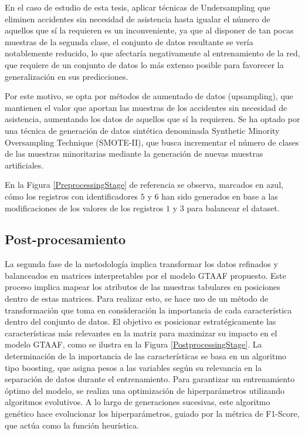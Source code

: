 \documentclass{uathesis-es}
\begin{document}
En el caso de estudio de esta tesis, aplicar técnicas de Undersampling que eliminen accidentes sin necesidad de asistencia hasta igualar el número de aquellos que sí la requieren es un inconveniente, ya que al disponer de tan pocas muestras de la segunda clase, el conjunto de datos resultante se vería notablemente reducido, lo que afectaría negativamente al entrenamiento de la red, que requiere de un conjunto de datos lo más extenso posible para favorecer la generalización en sus predicciones.

Por este motivo, se opta por métodos de aumentado de datos (upsampling), que mantienen el valor que aportan las muestras de los accidentes sin necesidad de asistencia, aumentando los datos de aquellos que sí la requieren. Se ha optado por una técnica de generación de datos sintética denominada Synthetic Minority Oversampling Technique (SMOTE-II), que busca incrementar el número de clases de las muestras minoritarias mediante la generación de nuevas muestras artificiales.

En la Figura \ref{PreprocessingStage} de referencia se observa, marcados en azul, cómo los registros con identificadores $5$ y $6$ han sido generados en base a las modificaciones de los valores de los registros $1$ y $3$ para balancear el dataset.



\subsection{Post-procesamiento}

La segunda fase de la metodología implica transformar los datos refinados y balanceados en matrices interpretables por el modelo GTAAF propuesto. Este proceso implica mapear los atributos de las muestras tabulares en posiciones dentro de estas matrices. Para realizar esto, se hace uso de un método de transformación que toma en consideración la importancia de cada característica dentro del conjunto de datos. El objetivo es posicionar estratégicamente las características más relevantes en la matriz para maximizar su impacto en el modelo GTAAF, como se ilustra en la Figura \ref{PostprocessingStage}. La determinación de la importancia de las características se basa en un algoritmo tipo boosting, que asigna pesos a las variables según su relevancia en la separación de datos durante el entrenamiento. Para garantizar un entrenamiento óptimo del modelo, se realiza una optimización de hiperparámetros utilizando algoritmos evolutivos. A lo largo de generaciones sucesivas, este algoritmo genético hace evolucionar los hiperparámetros, guiado por la métrica de F1-Score, que actúa como la función heurística.
\end{document}
